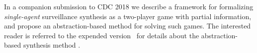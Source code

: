 
In a companion submission to CDC 2018 we describe a framework for formalizing \emph{single-agent} surveillance synthesis as a two-player game with partial information, and propose an abstraction-based method for solving such games. The interested reader is referred to the expended version~\cite{arxiv} for details about the abstraction-based synthesis method .



